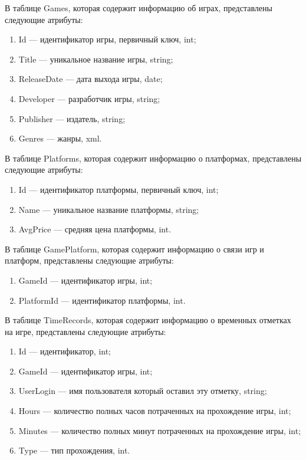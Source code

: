 В таблице Games, которая содержит информацию об играх, представлены следующие атрибуты:

\begin{enumerate}
	\item Id --- идентификатор игры, первичный ключ, int;
	\item Title --- уникальное название игры, string;
	\item ReleaseDate --- дата выхода игры, date;
	\item Developer --- разработчик игры, string;
	\item Publisher --- издатель, string;
	\item Genres --- жанры, xml.
\end{enumerate}

В таблице Platforms, которая содержит информацию о платформах, представлены следующие атрибуты:

\begin{enumerate}
	\item Id --- идентификатор платформы, первичный ключ, int;
	\item Name --- уникальное название платформы, string;
	\item AvgPrice --- средняя цена платформы, int.
\end{enumerate}

В таблице GamePlatform, которая содержит информацию о связи игр и платформ, представлены следующие атрибуты:

\begin{enumerate}
	\item GameId --- идентификатор игры, int;
	\item PlatformId --- идентификатор платформы, int.
\end{enumerate}

В таблице TimeRecords, которая содержит информацию о временных отметках на игре, представлены следующие атрибуты:

\begin{enumerate}
	\item Id --- идентификатор, int;
	\item GameId --- идентификатор игры, int;
	\item UserLogin --- имя пользователя который оставил эту отметку, string;
	\item Hours ---  количество полных часов потраченных на прохождение игры, int;
	\item Minutes --- количество полных минут потраченных на прохождение игры, int;
	\item Type --- тип прохождения, int. 
\end{enumerate}

